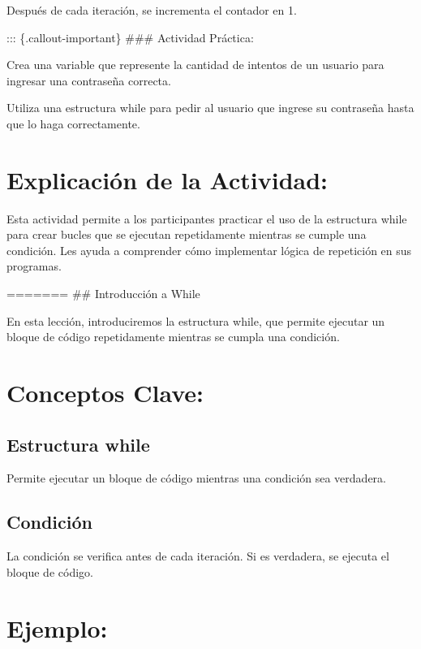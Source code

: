 \documentclass[
  a4paper,
  DIV=11,
  numbers=noendperiod,
  onepage,
  openany]{scrreprt}
\begin{document}
Después de cada iteración, se incrementa el contador en 1.

::: \{.callout-important\} \#\#\# Actividad Práctica:

Crea una variable que represente la cantidad de intentos de un usuario
para ingresar una contraseña correcta.

Utiliza una estructura while para pedir al usuario que ingrese su
contraseña hasta que lo haga correctamente.

\hypertarget{explicaciuxf3n-de-la-actividad-34}{%
\section{Explicación de la
Actividad:}\label{explicaciuxf3n-de-la-actividad-34}}

Esta actividad permite a los participantes practicar el uso de la
estructura while para crear bucles que se ejecutan repetidamente
mientras se cumple una condición. Les ayuda a comprender cómo
implementar lógica de repetición en sus programas.

======= \#\# Introducción a While

En esta lección, introduciremos la estructura while, que permite
ejecutar un bloque de código repetidamente mientras se cumpla una
condición.

\hypertarget{conceptos-clave-37}{%
\section{Conceptos Clave:}\label{conceptos-clave-37}}

\hypertarget{estructura-while-1}{%
\subsection{Estructura while}\label{estructura-while-1}}

Permite ejecutar un bloque de código mientras una condición sea
verdadera.

\hypertarget{condiciuxf3n-1}{%
\subsection{Condición}\label{condiciuxf3n-1}}

La condición se verifica antes de cada iteración. Si es verdadera, se
ejecuta el bloque de código.

\hypertarget{ejemplo-37}{%
\section{Ejemplo:}\label{ejemplo-37}}
\end{document}
